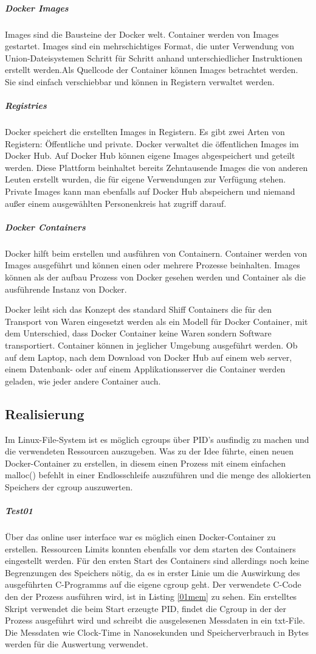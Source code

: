 \subparagraph{Docker Images}
Images sind die Bausteine der Docker welt. Container werden von Images gestartet. Images sind ein mehrschichtiges Format, die unter Verwendung von Union-Dateisystemen Schritt für Schritt anhand unterschiedlicher Instruktionen erstellt werden.Als Quellcode der Container können Images betrachtet werden. Sie sind einfach verschiebbar und können in Registern verwaltet werden.

\subparagraph{Registries}
Docker speichert die erstellten Images in Registern. Es gibt zwei Arten von Registern: Öffentliche und private. Docker verwaltet die öffentlichen Images im Docker Hub\cite{DockerInc.2016DockerHub}. Auf Docker Hub können eigene Images abgespeichert und geteilt werden. Diese Plattform beinhaltet bereits Zehntausende Images die von anderen Leuten erstellt wurden, die für eigene Verwendungen zur Verfügung stehen. Private Images kann man ebenfalls auf Docker Hub abspeichern und niemand außer einem ausgewählten Personenkreis hat zugriff darauf.

\subparagraph{Docker Containers}
Docker hilft beim erstellen und ausführen von Containern. Container werden von Images ausgeführt und können einen oder mehrere Prozesse beinhalten. Images können als der aufbau Prozess von Docker gesehen werden und Container als die ausführende Instanz von Docker.

Docker leiht sich das Konzept des standard Shiff Containers die für den Transport von Waren eingesetzt werden als ein Modell für Docker Container, mit dem Unterschied, dass Docker Container keine Waren sondern Software transportiert. Container können in jeglicher Umgebung ausgeführt werden. Ob auf dem Laptop, nach dem Download von Docker Hub auf einem web server, einem Datenbank- oder auf einem Applikationsserver die Container werden geladen, wie jeder andere Container auch.

\pagebreak

\subsection{Realisierung}
Im Linux-File-System ist es möglich cgroups über PID's ausfindig zu machen und die verwendeten Ressourcen auszugeben. Was zu der Idee führte, einen neuen Docker-Container zu erstellen, in diesem einen Prozess mit einem einfachen malloc() befehlt in einer Endlosschleife auszuführen und die menge des allokierten Speichers der cgroup auszuwerten. 

\subparagraph{Test01}
Über das online user interface war es möglich einen Docker-Container zu erstellen. Ressourcen Limits konnten ebenfalls vor dem starten des Containers eingestellt werden. Für den ersten Start des Containers sind allerdings noch keine Begrenzungen des Speichers nötig, da es in erster Linie um die Auswirkung des ausgeführten C-Programms auf die eigene cgroup geht. Der verwendete C-Code den der Prozess ausführen wird, ist in Listing \ref{01mem} zu sehen. Ein erstelltes Skript verwendet die beim Start erzeugte PID, findet die Cgroup in der der Prozess ausgeführt wird und schreibt die ausgelesenen Messdaten in ein txt-File. Die Messdaten wie Clock-Time in Nanosekunden und Speicherverbrauch in Bytes werden für die Auswertung verwendet.

